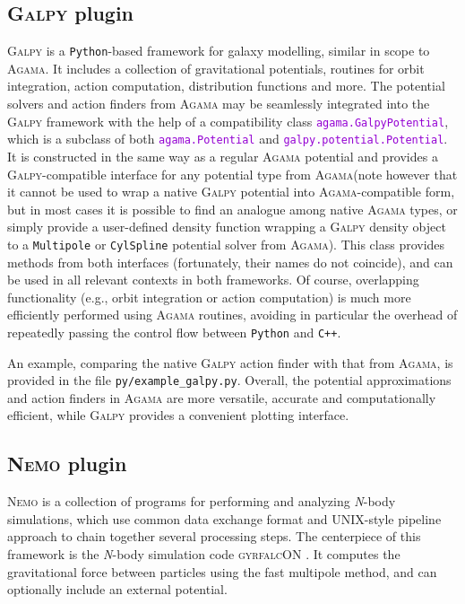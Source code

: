 \documentclass[12pt]{article}
\newcommand{\Agama}{\textsc{Agama}\xspace}
\newcommand{\Galpy}{\textsc{Galpy}\xspace}
\newcommand{\Nemo} {\textsc{Nemo}\xspace}
\newcommand{\Nbody}{\textsl{N}-body\xspace}
\newcommand{\Cpp}  {\texttt{C++}\xspace}
\newcommand{\Python}{\texttt{Python}\xspace}
\newcommand{\ttt}[1]{\textcolor{darkviolet}{\texttt{#1}}}
\newcommand{\ppp}[1]{\textcolor{darkolive} {\texttt{#1}}}
\begin{document}
\subsection{\Galpy plugin}  \label{sec:Galpy}

\Galpy \cite{Bovy2015} is a \Python-based framework for galaxy modelling, similar in scope to \Agama. It includes a collection of gravitational potentials, routines for orbit integration, action computation, distribution functions and more. 
The potential solvers and action finders from \Agama may be seamlessly integrated into the \Galpy framework with the help of a compatibility class \ttt{agama.GalpyPotential}, which is a subclass of both \ttt{agama.Potential} and \ttt{galpy.potential.Potential}. It is constructed in the same way as a regular \Agama potential and provides a \Galpy-compatible interface for any potential type from \Agama (note however that it cannot be used to wrap a native \Galpy potential into \Agama-compatible form, but in most cases it is possible to find an analogue among native \Agama types, or simply provide a user-defined density function wrapping a \Galpy density object to a \ppp{Multipole} or \ppp{CylSpline} potential solver from \Agama). This class provides methods from both interfaces (fortunately, their names do not coincide), and can be used in all relevant contexts in both frameworks. Of course, overlapping functionality (e.g., orbit integration or action computation) is much more efficiently performed using \Agama routines, avoiding in particular the overhead of repeatedly passing the control flow between \Python and \Cpp.

An example, comparing the native \Galpy action finder with that from \Agama, is provided in the file \texttt{py/example_galpy.py}. Overall, the potential approximations and action finders in \Agama are more versatile, accurate and computationally efficient, while \Galpy provides a convenient plotting interface.


\subsection{\Nemo plugin}  \label{sec:Nemo}

\Nemo \cite{Teuben1995} is a collection of programs for performing and analyzing \Nbody simulations, which use common data exchange format and UNIX-style pipeline approach to chain together several processing steps. The centerpiece of this framework is the \Nbody simulation code \textsc{gyrfalcON} \cite{Dehnen2000}. It computes the gravitational force between particles using the fast multipole method, and can optionally include an external potential.
\end{document}
